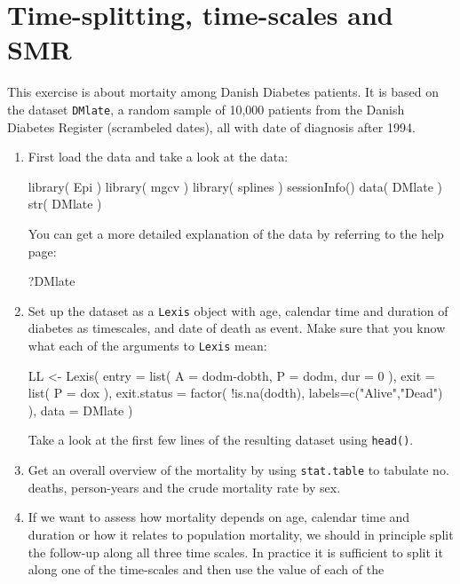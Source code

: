 
\renewcommand{\rwpre}{./graph/DMDK}
\section{Time-splitting, time-scales and SMR}
This exercise is about mortaity among Danish Diabetes patients. It is
based on the dataset \texttt{DMlate}, a random sample of 10,000
patients from the Danish Diabetes Register (scrambeled dates), all
with date of diagnosis after 1994.
\begin{enumerate}
\item First load the data and take a look at the data:
\begin{Schunk}
\begin{Sinput}
 library( Epi )
 library( mgcv )
 library( splines )
 sessionInfo()
 data( DMlate )
 str( DMlate )
\end{Sinput}
\end{Schunk}
You can get a more detailed explanation of the data by referring to
the help page:
\begin{Schunk}
\begin{Sinput}
 ?DMlate
\end{Sinput}
\end{Schunk}
\item Set up the dataset as a \texttt{Lexis} object with age, calendar
  time and duration of diabetes as timescales, and date of death as
  event. Make sure that you know what each of the arguments to
  \texttt{Lexis} mean:
\begin{Schunk}
\begin{Sinput}
 LL <- Lexis( entry = list( A = dodm-dobth,
                            P = dodm,
                          dur = 0 ),
               exit = list( P = dox ),
        exit.status = factor( !is.na(dodth),
                              labels=c("Alive","Dead") ),
               data = DMlate )
\end{Sinput}
\end{Schunk}
Take a look at the first few lines of the resulting dataset using \texttt{head()}.
\item Get an overall overview of the mortality by using
  \texttt{stat.table} to tabulate no. deaths, person-years and the
  crude mortality rate by sex.
\item If we want to assess how mortality depends on age, calendar time
  and duration or how it relates to population mortality, we should
  in principle split the follow-up along all 
  three time scales. In practice it is sufficient to split it along
  one of the time-scales and then use the value of each of the

\end{enumerate}
